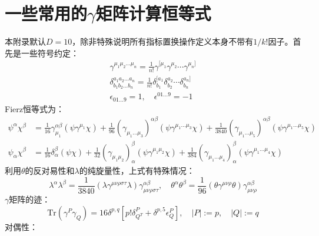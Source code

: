 \chapter{一些常用的$\gamma$矩阵计算恒等式}
本附录默认$D=10$，除非特殊说明所有指标置换操作定义本身不带有$1/k!$因子。首先是一些符号约定：
\begin{equation}
\begin{aligned}
		\gamma^{\mu_1\mu_2...\mu_n} = \frac{1}{n!} \gamma^{[\mu_1} \gamma^{\mu_2} \cdots \gamma^{\mu_n]}\\
	\delta_{b_1b_2...b_n}^{a_1a_2...a_n}=\frac{1}{n!}\delta_{b_1}^{[a_1}\delta_{b_2}^{a_2}\cdots\delta_{b_n}^{a_n]}\\
	\epsilon_{01...9}=1,\quad\epsilon^{01...9}=-1
\end{aligned}
\end{equation}
Fierz恒等式为：
\begin{align}
		\psi^\alpha \chi^\beta &= \frac{1}{16} \gamma_{\mu_1}^{\alpha\beta} (\psi \gamma^{\mu_1} \chi) + \frac{1}{96} (\gamma_{\mu_1...\mu_3})^{\alpha\beta} (\psi \gamma^{\mu_1...\mu_3} \chi) + \frac{1}{3840} (\gamma_{\mu_1...\mu_5})^{\alpha\beta} (\psi \gamma^{\mu_1...\mu_5} \chi) \\
		\psi_\alpha \chi^\beta &= \frac{1}{16} \delta_\alpha^\beta (\psi \chi) + \frac{1}{32} (\gamma_{\mu_1\mu_2})_\alpha^\beta (\psi \gamma^{\mu_1\mu_2} \chi) + \frac{1}{384} (\gamma_{\mu_1...\mu_4})_\alpha^\beta (\psi \gamma^{\mu_1...\mu_4} \chi)
\end{align}
利用$\theta$的反对易性和$\lambda$的纯旋量性，上式有特殊情况：
\begin{equation}
	\lambda^\alpha \lambda^\beta = \frac{1}{3840} (\lambda \gamma^{\mu\nu\rho\sigma\tau} \lambda) \gamma_{\mu\nu\rho\sigma\tau}^{\alpha\beta}, \quad \theta^\alpha \theta^\beta = \frac{1}{96} (\theta \gamma^{\mu\nu\rho} \theta) \gamma_{\mu\nu\rho}^{\alpha\beta}
\end{equation}
$\gamma$矩阵的迹：
\begin{equation}
	\mathrm{Tr}\left(\gamma^P\gamma_Q\right)=16\delta^{p,q}\left[p!\delta_{Q^T}^P+\delta^{p,5}\epsilon_Q^P\right],\quad|P|:=p,\quad|Q|:=q
\end{equation}
对偶性：
